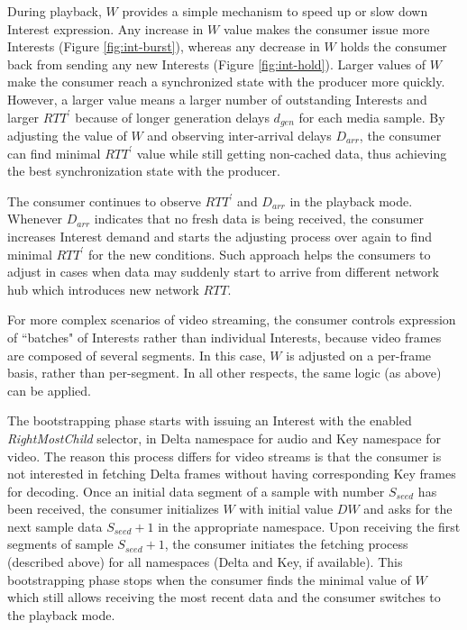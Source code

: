 \documentclass{icn/sig-alternate-2012} %
\newcommand{\wConcept}{Interest demand}
\begin{document}





During playback, $W$ provides a simple mechanism to speed up or slow down Interest expression. Any increase in $W$ value makes the consumer issue more Interests (Figure \ref{fig:int-burst}), whereas any decrease in $W$ holds the consumer back from sending any new Interests (Figure \ref{fig:int-hold}). Larger values of $W$ make the consumer reach a synchronized state with the producer more quickly. However, a larger value means a larger number of outstanding Interests and larger $RTT^\prime$ because of longer generation delays $d_{gen}$ for each media sample. By adjusting the value of $W$ and observing inter-arrival delays $D_{arr}$, the consumer can find minimal $RTT^\prime$ value while still getting non-cached data, thus achieving the best synchronization state with the producer.

The consumer continues to observe $RTT^\prime$ and $D_{arr}$ in the playback mode. Whenever $D_{arr}$ indicates that no fresh data is being received, the consumer increases \wConcept{} and starts the adjusting process over again to find minimal $RTT^\prime$ for the new conditions. Such approach helps the consumers to adjust in cases when data may suddenly start to arrive from different network hub which introduces new network $RTT$.

For more complex scenarios of video streaming, the consumer controls expression of ``batches" of Interests rather than individual Interests, because video frames are composed of several segments. In this case, $W$ is adjusted on a per-frame basis, rather than per-segment. In all other respects, the same logic (as above) can be applied.

The bootstrapping phase starts with issuing an Interest with the enabled \textit{RightMostChild} selector, in Delta namespace for audio and Key namespace for video. The reason this process differs for video streams is that the consumer is not interested in fetching Delta frames without having corresponding Key frames for decoding. Once an initial data segment of a sample with number $S_{seed}$ has been received, the consumer initializes $W$ with initial value $DW$ and asks for the next sample data $S_{seed}+1$ in the appropriate namespace. Upon receiving the first segments of sample $S_{seed}+1$, the consumer initiates the fetching process (described above) for all namespaces (Delta and Key, if available). This bootstrapping phase stops when the consumer finds the minimal value of $W$ which still allows receiving the most recent data and the consumer switches to the playback mode.
\end{document}
